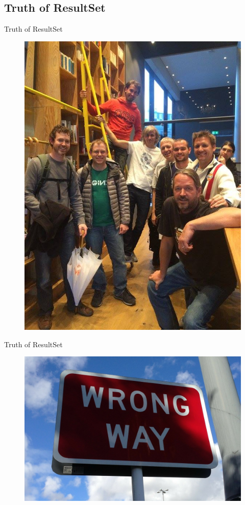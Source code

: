 \subsection{Truth of ResultSet}

\begin{frame}{Truth of ResultSet}
\begin{figure}[!ht]
\centering
\includegraphics[width=0.5\linewidth]{img/pdc_users.jpg}
\end{figure}
\end{frame}


\begin{frame}{Truth of ResultSet}
\begin{figure}[!ht]
\centering
\includegraphics[width=1\linewidth]{img/wrong-way.jpg}
\end{figure}
\end{frame}

